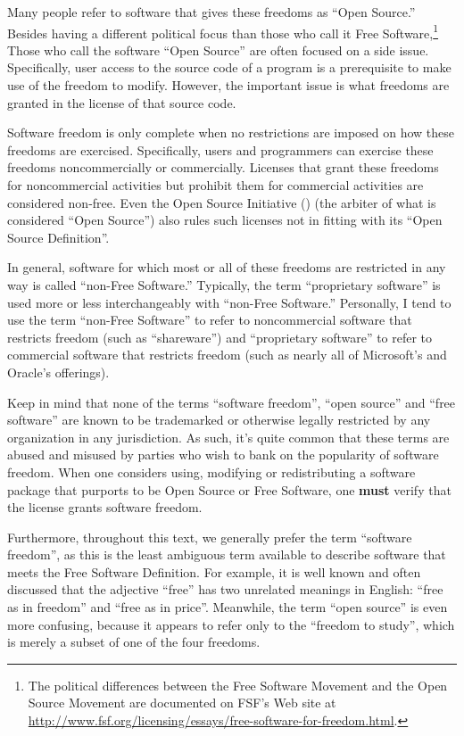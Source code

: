 Many people refer to software that gives these freedoms as ``Open Source.''
Besides having a different political focus than those who call it Free
Software,\footnote{The political differences between the Free Software
  Movement and the Open Source Movement are documented on FSF's Web site at
  \url{http://www.fsf.org/licensing/essays/free-software-for-freedom.html}.}
Those who call the software ``Open Source'' are often focused on a side
issue.  Specifically, user access to the source code of a program is a
prerequisite to make use of the freedom to modify.  However, the important
issue is what freedoms are granted in the license of that source code.

Software freedom is only complete when no restrictions are imposed on how
these freedoms are exercised.  Specifically, users and programmers can
exercise these freedoms noncommercially or commercially.  Licenses that grant
these freedoms for noncommercial activities but prohibit them for commercial
activities are considered non-free.  Even the Open Source Initiative
() (the arbiter of what is considered ``Open Source'') also rules
such licenses not in fitting with its ``Open Source Definition''.

In general, software for which most or all of these freedoms are
restricted in any way is called ``non-Free Software.''  Typically, the
term ``proprietary software'' is used more or less interchangeably with
``non-Free Software.''  Personally, I tend to use the term ``non-Free
Software'' to refer to noncommercial software that restricts freedom
(such as ``shareware'') and ``proprietary software'' to refer to
commercial software that restricts freedom (such as nearly all of
Microsoft's and Oracle's offerings).

Keep in mind that none of the terms ``software freedom'', ``open source''
and ``free software'' are known to be trademarked or otherwise legally
restricted by any organization in
any jurisdiction.  As such, it's quite common that these terms are abused and
misused by parties who wish to bank on the popularity of software freedom.
When one considers using, modifying or redistributing a software package that
purports to be Open Source or Free Software, one \textbf{must} verify that
the license grants software freedom.

Furthermore, throughout this text, we generally prefer the term ``software
freedom'', as this is the least ambiguous term available to describe software
that meets the Free Software Definition.  For example, it is well known and
often discussed that the adjective ``free'' has two unrelated meanings in
English: ``free as in freedom'' and ``free as in price''.  Meanwhile, the
term ``open source'' is even more confusing, because it appears to refer only to the
``freedom to study'', which is merely a subset of one of the four freedoms.

